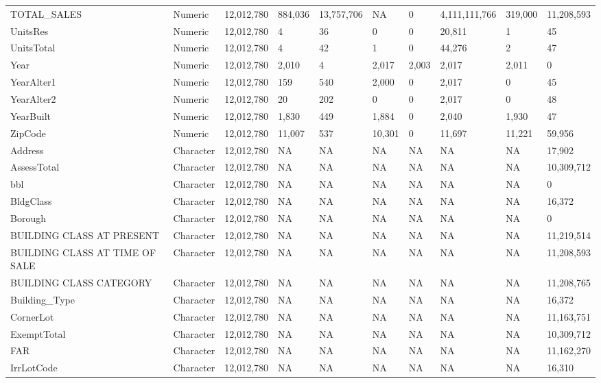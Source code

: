 \documentclass[12pt,]{article}
\begin{document}
\begin{table}
{\begin{tabular}[t]{llllllllll}
\addlinespace
TOTAL\_SALES & Numeric & 12,012,780 & 884,036 & 13,757,706 & NA & 0 & 4,111,111,766 & 319,000 & 11,208,593\\
UnitsRes & Numeric & 12,012,780 & 4 & 36 & 0 & 0 & 20,811 & 1 & 45\\
UnitsTotal & Numeric & 12,012,780 & 4 & 42 & 1 & 0 & 44,276 & 2 & 47\\
Year & Numeric & 12,012,780 & 2,010 & 4 & 2,017 & 2,003 & 2,017 & 2,011 & 0\\
YearAlter1 & Numeric & 12,012,780 & 159 & 540 & 2,000 & 0 & 2,017 & 0 & 45\\
\addlinespace
YearAlter2 & Numeric & 12,012,780 & 20 & 202 & 0 & 0 & 2,017 & 0 & 48\\
YearBuilt & Numeric & 12,012,780 & 1,830 & 449 & 1,884 & 0 & 2,040 & 1,930 & 47\\
ZipCode & Numeric & 12,012,780 & 11,007 & 537 & 10,301 & 0 & 11,697 & 11,221 & 59,956\\
Address & Character & 12,012,780 & NA & NA & NA & NA & NA & NA & 17,902\\
AssessTotal & Character & 12,012,780 & NA & NA & NA & NA & NA & NA & 10,309,712\\
\addlinespace
bbl & Character & 12,012,780 & NA & NA & NA & NA & NA & NA & 0\\
BldgClass & Character & 12,012,780 & NA & NA & NA & NA & NA & NA & 16,372\\
Borough & Character & 12,012,780 & NA & NA & NA & NA & NA & NA & 0\\
BUILDING CLASS AT PRESENT & Character & 12,012,780 & NA & NA & NA & NA & NA & NA & 11,219,514\\
BUILDING CLASS AT TIME OF SALE & Character & 12,012,780 & NA & NA & NA & NA & NA & NA & 11,208,593\\
\addlinespace
BUILDING CLASS CATEGORY & Character & 12,012,780 & NA & NA & NA & NA & NA & NA & 11,208,765\\
Building\_Type & Character & 12,012,780 & NA & NA & NA & NA & NA & NA & 16,372\\
CornerLot & Character & 12,012,780 & NA & NA & NA & NA & NA & NA & 11,163,751\\
ExemptTotal & Character & 12,012,780 & NA & NA & NA & NA & NA & NA & 10,309,712\\
FAR & Character & 12,012,780 & NA & NA & NA & NA & NA & NA & 11,162,270\\
\addlinespace
IrrLotCode & Character & 12,012,780 & NA & NA & NA & NA & NA & NA & 16,310\\

\end{tabular}}
\end{table}
\end{document}
